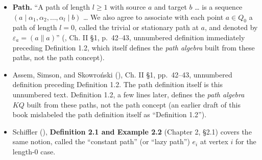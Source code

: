 \begin{itemize}
\tightlist
\item
  \textbf{Path.} ``A path of length \(l \geq 1\) with source \(a\) and target \(b\) \ldots{} is a sequence \((a \mid \alpha_1, \alpha_2, \ldots, \alpha_l \mid b)\) \ldots{} We also agree to associate with each point \(a \in Q_0\) a path of length \(l = 0\), called the trivial or stationary path at \(a\), and denoted by \(\varepsilon_a = (a \| a)\)'' (\cite{AssemSimsonSkowronski2006}, Ch. II §1, p.~42--43, unnumbered definition immediately preceding Definition 1.2, which itself defines the \emph{path algebra} built from these paths, not the path concept).
\item
  Assem, Simson, and Skowroński (\cite{AssemSimsonSkowronski2006}), Ch. II §1, pp.~42--43, unnumbered definition preceding Definition 1.2. The path definition itself is this unnumbered text. Definition 1.2, a few lines later, defines the \emph{path algebra} \(KQ\) built from these paths, not the path concept (an earlier draft of this book mislabeled the path definition itself as ``Definition 1.2'').
\item
  Schiffler (\cite{Schiffler2014}), \textbf{Definition 2.1 and Example 2.2} (Chapter 2, §2.1) covers the same notion, called the ``constant path'' (or ``lazy path'') \(e_i\) at vertex \(i\) for the length-\(0\) case.
\end{itemize}
